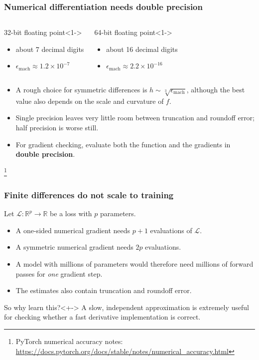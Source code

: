\documentclass[]{article}
\newcommand\blfootnote[1]{%
  \begingroup
  \renewcommand\thefootnote{}\footnote{#1}%
  \addtocounter{footnote}{-1}%
  \endgroup
}
\begin{document}
\begin{frame}
	\frametitle{Numerical differentiation needs double precision}

	\begin{columns}
		\begin{block}{32-bit floating point}<1->
			\begin{itemize}
				\item about 7 decimal digits
				\item $\epsilon_{\mathrm{mach}} \approx 1.2\times10^{-7}$
			\end{itemize}
		\end{block}

		\begin{block}{64-bit floating point}<1->
			\begin{itemize}
				\item about 16 decimal digits
				\item $\epsilon_{\mathrm{mach}} \approx 2.2\times10^{-16}$
			\end{itemize}
		\end{block}
	\end{columns}

	\begin{itemize}
		\item<2-> A rough choice for symmetric differences is $h\sim\sqrt[3]{\epsilon_{\mathrm{mach}}}$, although the best value also depends on the scale and curvature of $f$.
		\item<2-> Single precision leaves very little room between truncation and roundoff error; half precision is worse still.
		\item<3-> For gradient checking, evaluate both the function and the gradients in \textbf{double precision}.
	\end{itemize}
	\blfootnote{PyTorch numerical accuracy notes: \url{https://docs.pytorch.org/docs/stable/notes/numerical_accuracy.html}}
\end{frame}


\begin{frame}
	\frametitle{Finite differences do not scale to training}

	Let $\mathcal{L}:\mathbb{R}^p\rightarrow\mathbb{R}$ be a loss with $p$ parameters.

	\begin{itemize}
		\item A one-sided numerical gradient needs $p+1$ evaluations of $\mathcal{L}$.
		\item A symmetric numerical gradient needs $2p$ evaluations.
		\item A model with millions of parameters would therefore need millions of forward passes for \emph{one} gradient step.
		\item The estimates also contain truncation and roundoff error.
	\end{itemize}

	\begin{alertblock}{So why learn this?}<+->
		A slow, independent approximation is extremely useful for checking whether a fast derivative implementation is correct.
	\end{alertblock}
\end{frame}
\end{document}

